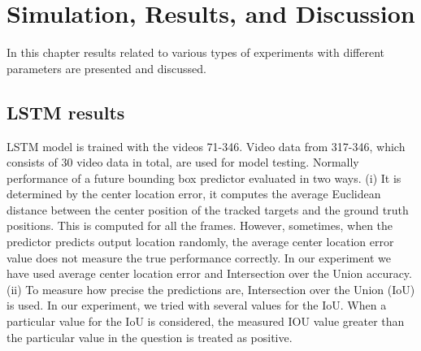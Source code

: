 \chapter{Simulation, Results, and Discussion}

In this chapter results related to various types of experiments with different parameters are presented and discussed.

\section{LSTM results} \label{observations}
LSTM model is trained with the videos 71-346. Video data from 317-346, which consists of 30 video data in total, are used for model testing. Normally performance of a future bounding box predictor evaluated  in two ways. 
(i) It is determined by the center location error, it computes the average
Euclidean distance between the center position of the tracked targets and the ground truth
positions. This is computed for all the frames. However, sometimes, when the predictor predicts 
output location randomly, the average center location error value does not measure the
true performance correctly. In our experiment we have used average center location error and Intersection over the Union  accuracy. \\

(ii) To measure how precise the predictions are, Intersection over the Union (IoU) is used. In our experiment, we tried with several values for the IoU. When a particular value for the IoU is considered, the measured IOU value greater than the particular value in the question is treated as positive.


